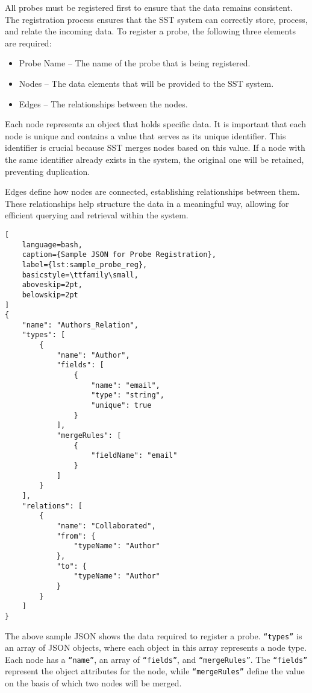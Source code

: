All probes must be registered first to ensure that the data remains consistent. The registration process ensures that the SST system can correctly store, process, and relate the incoming data. To register a probe, the following three elements are required:

\begin{itemize}
    \item Probe Name – The name of the probe that is being registered.
    \item Nodes – The data elements that will be provided to the SST system.
    \item Edges – The relationships between the nodes.
\end{itemize}

Each node represents an object that holds specific data. It is important that each node is unique and contains a value that serves as its unique identifier. This identifier is crucial because SST merges nodes based on this value. If a node with the same identifier already exists in the system, the original one will be retained, preventing duplication.

Edges define how nodes are connected, establishing relationships between them. These relationships help structure the data in a meaningful way, allowing for efficient querying and retrieval within the system.
\begin{lstlisting}[
    language=bash, 
    caption={Sample JSON for Probe Registration}, 
    label={lst:sample_probe_reg},
    basicstyle=\ttfamily\small,
    aboveskip=2pt,
    belowskip=2pt
]
{
    "name": "Authors_Relation",
    "types": [
        {
            "name": "Author",
            "fields": [
                {
                    "name": "email",
                    "type": "string",
                    "unique": true
                }
            ],
            "mergeRules": [
                {
                    "fieldName": "email"
                }
            ]
        }
    ],
    "relations": [
        {
            "name": "Collaborated",
            "from": {
                "typeName": "Author"
            },
            "to": {
                "typeName": "Author"
            }
        }
    ]
}
\end{lstlisting}

The above sample JSON shows the data required to register a probe. \texttt{``types''} is an array of JSON objects, where each object in this array represents a node type. Each node has a \texttt{``name''}, an array of \texttt{``fields''}, and \texttt{``mergeRules''}. The \texttt{``fields''} represent the object attributes for the node, while \texttt{``mergeRules''} define the value on the basis of which two nodes will be merged.  


